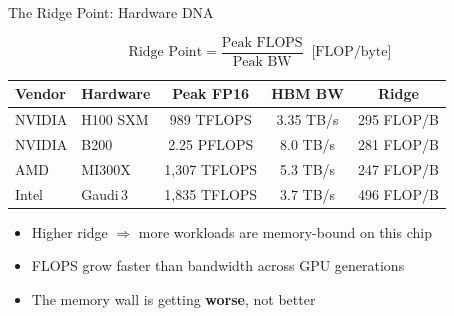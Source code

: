 \documentclass[aspectratio=169, 12pt]{beamer}
\begin{document}
\begin{frame}[shrink]{The Ridge Point: Hardware DNA}

\small
\[
  \text{Ridge Point} = \frac{\text{Peak FLOPS}}{\text{Peak BW}}
  \;\;\bigl[\text{FLOP/byte}\bigr]
\]

\vspace{0.2cm}
\scriptsize
\begin{tabular}{llccc}
\toprule
\textbf{Vendor} & \textbf{Hardware} & \textbf{Peak FP16} & \textbf{HBM BW} & \textbf{Ridge} \\
\midrule
NVIDIA & H100 SXM  & 989 TFLOPS  & 3.35 TB/s & 295 FLOP/B \\
NVIDIA & B200      & 2.25 PFLOPS & 8.0 TB/s  & 281 FLOP/B \\
AMD    & MI300X    & 1,307 TFLOPS & 5.3 TB/s & 247 FLOP/B \\
Intel  & Gaudi\,3  & 1,835 TFLOPS & 3.7 TB/s & 496 FLOP/B \\
\bottomrule
\end{tabular}
\small

\vspace{0.3cm}
\begin{itemize}
  \item Higher ridge $\Rightarrow$ more workloads are memory-bound on this chip
  \item \alert{FLOPS grow faster than bandwidth across GPU generations}
  \item The memory wall is getting \textbf{worse}, not better
\end{itemize}
\end{frame}
\end{document}
